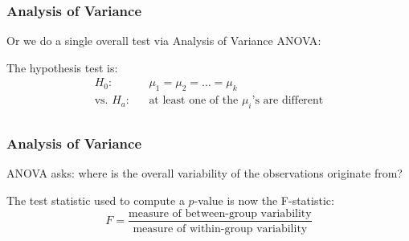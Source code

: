 \documentclass[handout]{beamer}
\newcommand{\blue}[1]{\textcolor{blue2}{#1}}
\begin{document}
\begin{frame}
\frametitle{Analysis of Variance}
%
%

Or we do \blue{a single overall test} via \blue{Analysis of Variance ANOVA}:

\vspace{0.5cm}

\pause The hypothesis test is:
\begin{eqnarray*}
H_0: && \mu_1 = \mu_2 = \ldots = \mu_k\\
\mbox{vs. } H_a:  && \mbox{at least one of the $\mu_i$'s are different}\\
\end{eqnarray*}

\end{frame}



\begin{frame}
\frametitle{Analysis of Variance}
%
%

ANOVA asks:  where is the overall variability of the observations originate from?

\vspace{0.5cm}

\pause The \blue{test statistic} used to compute a $p$-value is now the \blue{F-statistic}:
\[
F = \frac{\mbox{measure of between-group variability}}{\mbox{measure of within-group variability}}
\]

\end{frame}
\end{document}
